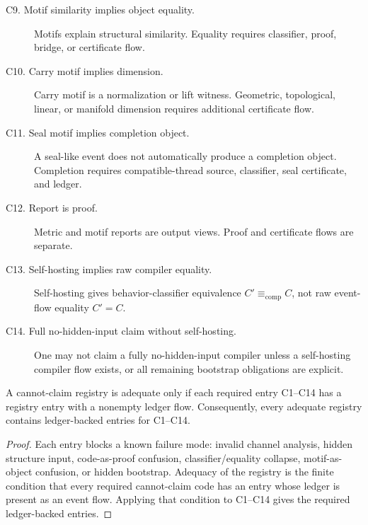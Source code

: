 \begin{definition}
\begin{description}
\item[C9. Motif similarity implies object equality.]
Motifs explain structural similarity. Equality requires classifier, proof, bridge, or certificate flow.

\item[C10. Carry motif implies dimension.]
Carry motif is a normalization or lift witness. Geometric, topological, linear, or manifold dimension requires additional certificate flow.

\item[C11. Seal motif implies completion object.]
A seal-like event does not automatically produce a completion object. Completion requires compatible-thread source, classifier, seal certificate, and ledger.

\item[C12. Report is proof.]
Metric and motif reports are output views. Proof and certificate flows are separate.

\item[C13. Self-hosting implies raw compiler equality.]
Self-hosting gives behavior-classifier equivalence $C'\equiv_{\mathrm{comp}}C$, not raw event-flow equality $C'=C$.

\item[C14. Full no-hidden-input claim without self-hosting.]
One may not claim a fully no-hidden-input compiler unless a self-hosting compiler flow exists, or all remaining bootstrap obligations are explicit.
\end{description}
\end{definition}

\begin{theorem}
\label{thm:main-theorems-cannot-claim-registry-mandatory}
A cannot-claim registry is adequate only if each required entry C1--C14 has a registry entry with a nonempty ledger flow. Consequently, every adequate registry contains ledger-backed entries for C1--C14.
\end{theorem}

\begin{proof}
Each entry blocks a known failure mode: invalid channel analysis, hidden structure input, code-as-proof confusion, classifier/equality collapse, motif-as-object confusion, or hidden bootstrap. Adequacy of the registry is the finite condition that every required cannot-claim code has an entry whose ledger is present as an event flow. Applying that condition to C1--C14 gives the required ledger-backed entries.
\end{proof}

